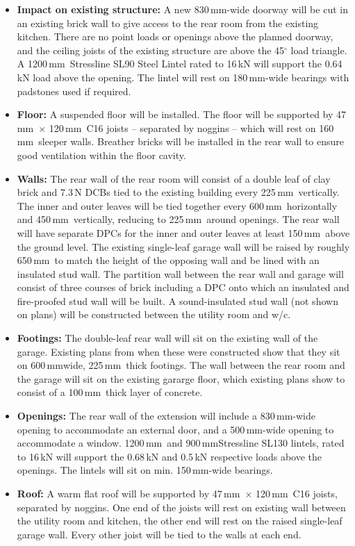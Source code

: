 \documentclass{extension}
\newcommand{\mm}{\,$\mathrm{mm}$}
\begin{document}
\begin{itemize}
  \item {\bf Impact on existing structure:} A new 830\mm -wide doorway will be cut in an existing brick wall to give access to the rear room from the existing kitchen. There are no point loads or openings above the planned doorway, and the ceiling joists of the existing structure are above the 45$^\circ$ load triangle. A 1200\mm\ Stressline SL90 Steel Lintel rated to 16\,kN will support the 0.64\,kN load above the opening. The lintel will rest on 180\mm -wide bearings with padstones used if required.
  \item {\bf Floor:} A suspended floor will be installed. The floor will be supported by 47\mm\ $\times$ 120\mm\ C16 joists -- separated by noggins -- which will rest on 160\mm\ sleeper walls. Breather bricks will be installed in the rear wall to ensure good ventilation within the floor cavity.
  \item {\bf Walls:} The rear wall of the rear room will consist of a double leaf of clay brick and 7.3\,N DCBs tied to the existing building every 225\mm\ vertically. The inner and outer leaves will be tied together every 600\mm\ horizontally and 450\mm\ vertically, reducing to 225\mm\ around openings. The rear wall will have separate DPCs for the inner and outer leaves at least 150\mm\ above the ground level. The existing single-leaf garage wall will be raised by roughly 650\mm\ to match the height of the opposing wall and be lined with an insulated stud wall. The partition wall between the rear wall and garage will consist of three courses of brick including a DPC onto which an insulated and fire-proofed stud wall will be built. A sound-insulated stud wall (not shown on plans) will be constructed between the utility room and w/c.
  \item {\bf Footings:} The double-leaf rear wall will sit on the existing wall of the garage. Existing plans from when these were constructed show that they sit on 600\mm wide, 225\mm\ thick footings. The wall between the rear room and the garage will sit on the existing gararge floor, which existing plans show to consist of a 100\mm\ thick layer of concrete.
  \item {\bf Openings:} The rear wall of the extension will include a 830\mm -wide opening to accommodate an external door, and a 500\mm -wide opening to accommodate a window. 1200\mm\ and 900\mm Stressline SL130 lintels\cite{esteel}, rated to 16\,kN will support the 0.68\,kN and 0.5\,kN respective loads above the openings. The lintels will sit on min. 150\mm -wide bearings.
  \item {\bf Roof:} A warm flat roof will be supported by 47\mm\ $\times$ 120\mm\ C16 joists, separated by noggins. One end of the joists will rest on existing wall between the utility room and kitchen, the other end will rest on the raised single-leaf garage wall. Every other joist will be tied to the walls at each end.
\end{itemize}
\end{document}
